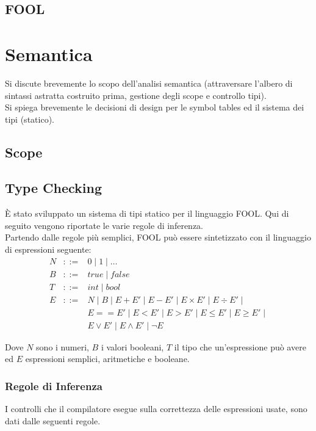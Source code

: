 \documentclass{scrreprt}
\begin{document}
\section{FOOL}

\chapter{Semantica}
Si discute brevemente lo scopo dell'analisi semantica (attraversare l'albero di sintassi astratta costruito prima, gestione
degli scope e controllo tipi).\\
Si spiega brevemente le decisioni di design per le symbol tables ed il sistema dei tipi (statico).
\section{Scope}

\section{Type Checking}
È stato sviluppato un sistema di tipi statico per il linguaggio FOOL. Qui di seguito vengono riportate le varie regole di inferenza.\\

Partendo dalle regole più semplici, FOOL può essere sintetizzato con il linguaggio di espressioni seguente:
\[
\begin{array}{lcl}
N & ::= & 0 \mid 1 \mid \dots\\ 
B & ::= &  true \mid false \\
T & ::= & int \mid bool \\
E & ::= & N \mid B \mid E + E' \mid E - E' \mid E \times E' \mid E \div E' \mid\\
& & E == E' \mid E < E '\mid E > E' \mid E \le E' \mid E \ge E' \mid \\
& & E \lor E' \mid E \land E' \mid \lnot E 
\end{array}
\]

Dove $N$ sono i numeri, $B$ i valori booleani, $T$ il tipo che un'espressione può avere ed $E$ espressioni semplici, aritmetiche e booleane.
\subsection{Regole di Inferenza}

I controlli che il compilatore esegue sulla correttezza delle espressioni usate, sono dati dalle seguenti regole.
\end{document}
